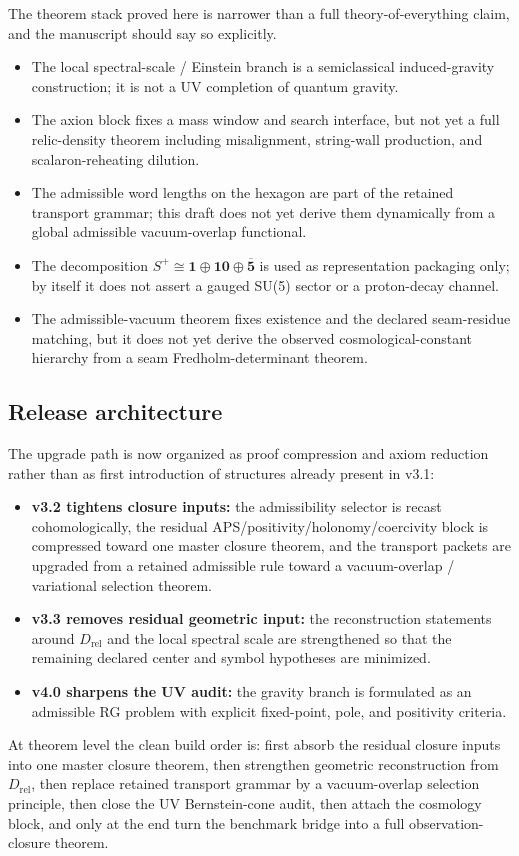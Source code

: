 The theorem stack proved here is narrower than a full theory-of-everything claim, and the manuscript should say so explicitly.
\begin{itemize}[leftmargin=1.5em, topsep=3pt, itemsep=2pt]
    \item The local spectral-scale / Einstein branch is a semiclassical induced-gravity construction; it is not a UV completion of quantum gravity.
    \item The axion block fixes a mass window and search interface, but not yet a full relic-density theorem including misalignment, string-wall production, and scalaron-reheating dilution.
    \item The admissible word lengths on the hexagon are part of the retained transport grammar; this draft does not yet derive them dynamically from a global admissible vacuum-overlap functional.
    \item The decomposition $S^+\cong \mathbf 1\oplus \mathbf{10}\oplus \overline{\mathbf 5}$ is used as representation packaging only; by itself it does not assert a gauged SU(5) sector or a proton-decay channel.
    \item The admissible-vacuum theorem fixes existence and the declared seam-residue matching, but it does not yet derive the observed cosmological-constant hierarchy from a seam Fredholm-determinant theorem.
\end{itemize}

\subsection{Release architecture}

The upgrade path is now organized as proof compression and axiom reduction rather
than as first introduction of structures already present in v3.1:
\begin{itemize}[leftmargin=1.5em, topsep=3pt, itemsep=2pt]
    \item \textbf{v3.2 tightens closure inputs:} the admissibility selector is recast cohomologically, the residual APS/positivity/holonomy/coercivity block is compressed toward one master closure theorem, and the transport packets are upgraded from a retained admissible rule toward a vacuum-overlap / variational selection theorem.
    \item \textbf{v3.3 removes residual geometric input:} the reconstruction statements around $D_{\mathrm{rel}}$ and the local spectral scale are strengthened so that the remaining declared center and symbol hypotheses are minimized.
    \item \textbf{v4.0 sharpens the UV audit:} the gravity branch is formulated as an admissible RG problem with explicit fixed-point, pole, and positivity criteria.
\end{itemize}
At theorem level the clean build order is: first absorb the residual closure inputs into
one master closure theorem, then strengthen geometric reconstruction from
$D_{\mathrm{rel}}$, then replace retained transport grammar by a vacuum-overlap
selection principle, then close the UV Bernstein-cone audit, then attach the
cosmology block, and only at the end turn the benchmark bridge into a full
observation-closure theorem.

